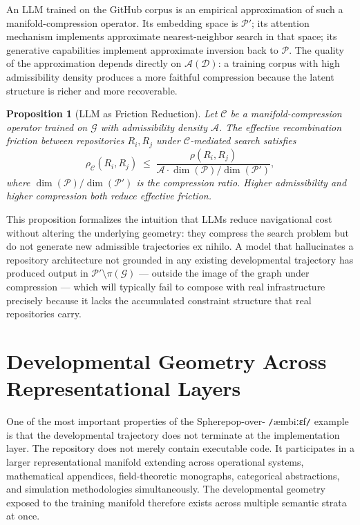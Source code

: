\documentclass[11pt]{article}
\newcommand{\ambibf}{%
  \texttt{/}\textnormal{æmbiːɛf}\texttt{/}%
}
\newtheorem{proposition}[theorem]{Proposition}
\begin{document}
An LLM trained on the GitHub corpus is an empirical approximation of such a
manifold-compression operator. Its embedding space is $\mathcal{P}'$; its
attention mechanism implements approximate nearest-neighbor search in that
space; its generative capabilities implement approximate inversion back to
$\mathcal{P}$. The quality of the approximation depends directly on
$\mathcal{A}(\mathcal{D})$: a training corpus with high admissibility density
produces a more faithful compression because the latent structure is richer
and more recoverable.

\begin{proposition}[LLM as Friction Reduction]
Let $\mathcal{C}$ be a manifold-compression operator trained on $\mathcal{G}$
with admissibility density $\mathcal{A}$. The effective recombination friction
between repositories $R_i, R_j$ under $\mathcal{C}$-mediated search satisfies
\[
\rho_\mathcal{C}(R_i, R_j) \;\leq\; \frac{\rho(R_i,R_j)}{\mathcal{A} \cdot
\dim(\mathcal{P})/\dim(\mathcal{P}')},
\]
where $\dim(\mathcal{P})/\dim(\mathcal{P}')$ is the compression ratio.
Higher admissibility and higher compression both reduce effective friction.
\end{proposition}

This proposition formalizes the intuition that LLMs reduce navigational
cost without altering the underlying geometry: they compress the search
problem but do not generate new admissible trajectories ex nihilo. A model
that hallucinates a repository architecture not grounded in any existing
developmental trajectory has produced output in $\mathcal{P}' \setminus
\pi(\mathcal{G})$ --- outside the image of the graph under compression ---
which will typically fail to compose with real infrastructure precisely because
it lacks the accumulated constraint structure that real repositories carry.

\section{Developmental Geometry Across Representational Layers}

One of the most important properties of the Spherepop-over-\ambibf{} example is
that the developmental trajectory does not terminate at the implementation layer.
The repository does not merely contain executable code. It participates in a
larger representational manifold extending across operational systems,
mathematical appendices, field-theoretic monographs, categorical abstractions,
and simulation methodologies simultaneously. The developmental geometry exposed
to the training manifold therefore exists across multiple semantic strata at once.
\end{document}
